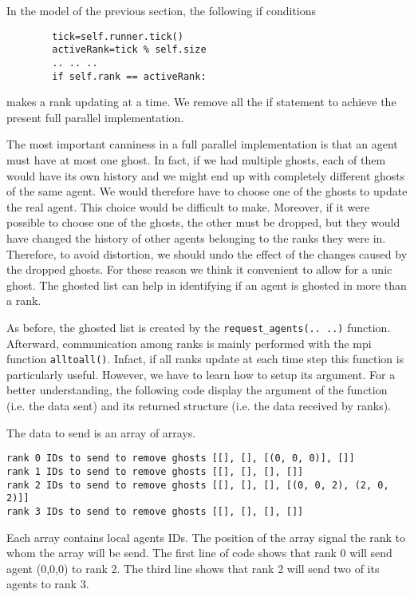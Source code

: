 \documentclass{article}
\begin{document}
In the model of the previous section, the following if conditions
\begin{verbatim}
        tick=self.runner.tick()
        activeRank=tick % self.size
        .. .. ..
        if self.rank == activeRank:
\end{verbatim}
makes a rank updating at a time. We remove all the if statement to achieve the present full parallel implementation.

The most important canniness in a full parallel implementation is that an agent must have at most one ghost. 
In fact, if we had multiple ghosts, each of them would have its own history and we might end up with completely different ghosts of the same agent. We would therefore have to choose one of the ghosts to update the real agent. This choice would be difficult to make. Moreover, if it were possible to choose one of the ghosts, the other must be dropped, but they would have changed the history of other agents belonging to the ranks they were in. Therefore, to avoid distortion, we should undo the effect of the changes caused by the dropped ghosts. For these reason we think it convenient to allow for a unic ghost.
The ghosted list can help in identifying if an agent is ghosted in more than a rank. 

As before, the ghosted list is created by the \verb+request_agents(.. ..)+ function.
Afterward, communication among ranks is mainly performed with the mpi function \verb+alltoall()+. Infact, if all ranks update at each time step this function is particularly useful. However, we have to learn how to setup its argument. For a better understanding, the following code display the argument of the function (i.e. the data sent) and its returned structure (i.e. the data received by ranks).

The data to send is an array of arrays. 
\begin{verbatim}
rank 0 IDs to send to remove ghosts [[], [], [(0, 0, 0)], []]
rank 1 IDs to send to remove ghosts [[], [], [], []]
rank 2 IDs to send to remove ghosts [[], [], [], [(0, 0, 2), (2, 0, 2)]]
rank 3 IDs to send to remove ghosts [[], [], [], []]
\end{verbatim}
Each array contains local agents IDs. The position of the array signal the rank to whom the array will be send.
The first line of code shows that rank 0 will send agent (0,0,0) to rank 2. The third line shows that rank 2 will send two of its agents to rank 3.
\end{document}
